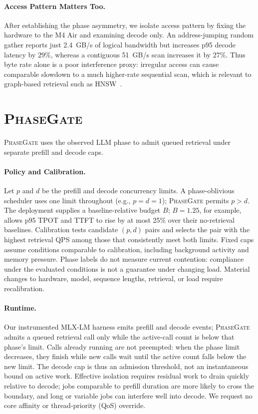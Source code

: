 \documentclass{article}
\newcommand{\system}{\textsc{PhaseGate}\xspace}
\begin{document}
\paragraph{Access Pattern Matters Too.}
After establishing the phase asymmetry, we isolate access pattern by fixing the hardware to the M4 Air and examining decode only.
An address-jumping random gather reports just 2.4~GB/s of logical bandwidth but increases p95 decode latency by 29\%, whereas a contiguous 51~GB/s scan increases it by 27\%.
Thus byte rate alone is a poor interference proxy: irregular access can cause comparable slowdown to a much higher-rate sequential scan, which is relevant to graph-based retrieval such as HNSW~\cite{malkov2020hnsw}.

\section{\texorpdfstring{\system}{PhaseGate}}

\system uses the observed LLM phase to admit queued retrieval under separate prefill and decode caps.

\paragraph{Policy and Calibration.}
Let $p$ and $d$ be the prefill and decode concurrency limits.
A phase-oblivious scheduler uses one limit throughout (e.g., $p=d=1$); \system permits $p>d$.
The deployment supplies a baseline-relative budget $B$; $B=1.25$, for example, allows p95 TPOT and TTFT to rise by at most 25\% over their no-retrieval baselines.
Calibration tests candidate $(p,d)$ pairs and selects the pair with the highest retrieval QPS among those that consistently meet both limits.
Fixed caps assume conditions comparable to calibration, including background activity and memory pressure.
Phase labels do not measure current contention: compliance under the evaluated conditions is not a guarantee under changing load.
Material changes to hardware, model, sequence lengths, retrieval, or load require recalibration.

\paragraph{Runtime.}
Our instrumented MLX-LM harness emits prefill and decode events; \system admits a queued retrieval call only while the active-call count is below that phase's limit.
Calls already running are not preempted: when the phase limit decreases, they finish while new calls wait until the active count falls below the new limit.
The decode cap is thus an admission threshold, not an instantaneous bound on active work.
Effective isolation requires residual work to drain quickly relative to decode; jobs comparable to prefill duration are more likely to cross the boundary, and long or variable jobs can interfere well into decode.
We request no core affinity or thread-priority (QoS) override.
\end{document}
